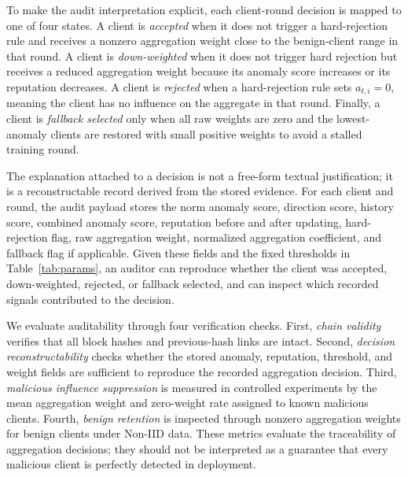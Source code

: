 \documentclass[preprint,12pt]{elsarticle}
\begin{document}
To make the audit interpretation explicit, each client-round decision is mapped to one of four states. A client is \emph{accepted} when it does not trigger a hard-rejection rule and receives a nonzero aggregation weight close to the benign-client range in that round. A client is \emph{down-weighted} when it does not trigger hard rejection but receives a reduced aggregation weight because its anomaly score increases or its reputation decreases. A client is \emph{rejected} when a hard-rejection rule sets $a_{t,i}=0$, meaning the client has no influence on the aggregate in that round. Finally, a client is \emph{fallback selected} only when all raw weights are zero and the lowest-anomaly clients are restored with small positive weights to avoid a stalled training round.

The explanation attached to a decision is not a free-form textual justification; it is a reconstructable record derived from the stored evidence. For each client and round, the audit payload stores the norm anomaly score, direction score, history score, combined anomaly score, reputation before and after updating, hard-rejection flag, raw aggregation weight, normalized aggregation coefficient, and fallback flag if applicable. Given these fields and the fixed thresholds in Table~\ref{tab:params}, an auditor can reproduce whether the client was accepted, down-weighted, rejected, or fallback selected, and can inspect which recorded signals contributed to the decision.

We evaluate auditability through four verification checks. First, \emph{chain validity} verifies that all block hashes and previous-hash links are intact. Second, \emph{decision reconstructability} checks whether the stored anomaly, reputation, threshold, and weight fields are sufficient to reproduce the recorded aggregation decision. Third, \emph{malicious influence suppression} is measured in controlled experiments by the mean aggregation weight and zero-weight rate assigned to known malicious clients. Fourth, \emph{benign retention} is inspected through nonzero aggregation weights for benign clients under Non-IID data. These metrics evaluate the traceability of aggregation decisions; they should not be interpreted as a guarantee that every malicious client is perfectly detected in deployment.
\end{document}
